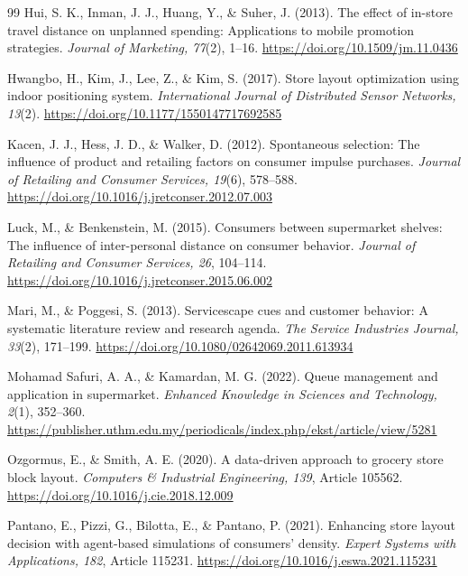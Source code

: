 \documentclass[sigconf,nonacm]{acmart}
\begin{document}
\begin{thebibliography}{99}
Hui, S. K., Inman, J. J., Huang, Y., \& Suher, J. (2013). The effect of in-store travel distance on unplanned spending: Applications to mobile promotion strategies. \emph{Journal of Marketing, 77}(2), 1--16. \url{https://doi.org/10.1509/jm.11.0436}

Hwangbo, H., Kim, J., Lee, Z., \& Kim, S. (2017). Store layout optimization using indoor positioning system. \emph{International Journal of Distributed Sensor Networks, 13}(2). \url{https://doi.org/10.1177/1550147717692585}

Kacen, J. J., Hess, J. D., \& Walker, D. (2012). Spontaneous selection: The influence of product and retailing factors on consumer impulse purchases. \emph{Journal of Retailing and Consumer Services, 19}(6), 578--588. \url{https://doi.org/10.1016/j.jretconser.2012.07.003}

Luck, M., \& Benkenstein, M. (2015). Consumers between supermarket shelves: The influence of inter-personal distance on consumer behavior. \emph{Journal of Retailing and Consumer Services, 26}, 104--114. \url{https://doi.org/10.1016/j.jretconser.2015.06.002}

Mari, M., \& Poggesi, S. (2013). Servicescape cues and customer behavior: A systematic literature review and research agenda. \emph{The Service Industries Journal, 33}(2), 171--199. \url{https://doi.org/10.1080/02642069.2011.613934}

Mohamad Safuri, A. A., \& Kamardan, M. G. (2022). Queue management and application in supermarket. \emph{Enhanced Knowledge in Sciences and Technology, 2}(1), 352--360. \url{https://publisher.uthm.edu.my/periodicals/index.php/ekst/article/view/5281}

Ozgormus, E., \& Smith, A. E. (2020). A data-driven approach to grocery store block layout. \emph{Computers \& Industrial Engineering, 139}, Article 105562. \url{https://doi.org/10.1016/j.cie.2018.12.009}

Pantano, E., Pizzi, G., Bilotta, E., \& Pantano, P. (2021). Enhancing store layout decision with agent-based simulations of consumers' density. \emph{Expert Systems with Applications, 182}, Article 115231. \url{https://doi.org/10.1016/j.eswa.2021.115231}


\end{thebibliography}
\end{document}
